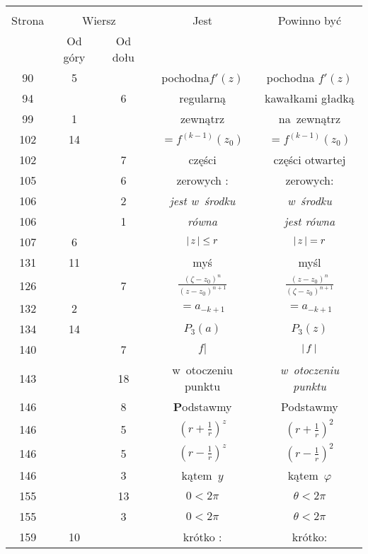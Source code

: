 \documentclass[a4paper,11pt]{article}
\begin{document}
\begin{center}
  \begin{tabular}{|c|c|c|c|c|}
    \hline
    & \multicolumn{2}{c|}{} & & \\
    Strona & \multicolumn{2}{c|}{Wiersz} & Jest
                              & Powinno być \\ \cline{2-3}
    & Od góry & Od dołu & & \\
    \hline
    90  &  5 & & pochodna$f'( z )$ & pochodna $f'( z )$ \\
    94  & &  6 & regularną & kawałkami gładką \\
    99  &  1 & & zewnątrz & na~zewnątrz \\
    102 & 14 & & $=\!\! f^{ ( k - 1 ) }( z_{ 0 } )$
           & $= f^{ ( k - 1 ) }( z_{ 0 } )$ \\
    102 & &  7 & części & części otwartej \\
    105 & &  6 & zerowych : & zerowych: \\
    106 & &  2 & \emph{jest w~środku} & \emph{w~środku} \\
    106 & &  1 & \emph{równa} & \emph{jest równa} \\
    107 &  6 & & $\left| \,  z  \, \right| \leq r$ & $\left| \,  z  \, \right| = r$ \\
    131 & 11 & & myś & myśl \\
    126 & &  7 & $\frac{ ( \zeta - z_{ 0 } )^{ n } }{
                 ( z - z_{ 0 } )^{ n + 1 } }$
           & $\frac{ ( z - z_{ 0 } )^{ n } }{
             ( \zeta - z_{ 0 } )^{ n + 1 } }$ \\
    132 &  2 & & $=\!\! a_{ -k + 1 }$ & $= a_{ -k + 1 }$ \\
    134 & 14 & & $P_{ 3 }( a )$ & $P_{ 3 }( z )$ \\
    140 & &  7 & $f |$ & $\left| \,  f  \, \right|$ \\
    143 & & 18 & w~otoczeniu punktu & \emph{w~otoczeniu punktu} \\
    146 & &  8 & \textbf{P}odstawmy & Podstawmy \\
    146 & &  5 & $( r + \frac{ 1 }{ r } )^{ z }$
           & $( r + \frac{ 1 }{ r } )^{ 2 }$ \\
    146 & &  5 & $( r - \frac{ 1 }{ r } )^{ z }$
           & $( r - \frac{ 1 }{ r } )^{ 2 }$ \\
    146 & &  3 & kątem~$y$ & kątem~$\varphi$ \\
    155 & & 13 & $0 < 2\pi$ & $\theta < 2\pi$ \\
    155 & &  3 & $0 < 2\pi$ & $\theta < 2\pi$ \\
    159 & 10 & & krótko : & krótko: \\

\end{tabular}
\end{center}
\end{document}
